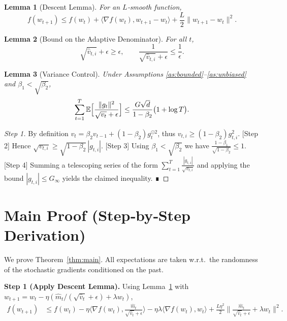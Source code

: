 \documentclass{article}
\newtheorem{lemma}{Lemma}
\newcommand{\E}{\mathbb{E}}
\begin{document}
\begin{lemma}[Descent Lemma]\label{lem:descent}
For an $L$‑smooth function,
\[
f(w_{t+1}) \le f(w_t) + \langle\nabla f(w_t), w_{t+1}-w_t\rangle + \frac{L}{2}\|w_{t+1}-w_t\|^{2}.
\]
\end{lemma}

\begin{lemma}[Bound on the Adaptive Denominator]\label{lem:denom}
For all $t$,
\[
\sqrt{\hat v_{t,i}}+\epsilon \ge \epsilon,\qquad
\frac{1}{\sqrt{\hat v_{t,i}}+\epsilon}\le \frac{1}{\epsilon}.
\]
\end{lemma}

\begin{lemma}[Variance Control]\label{lem:variance}
Under Assumptions \ref{as:bounded}–\ref{as:unbiased} and $\beta_1<\sqrt{\beta_2}$,
\[
\sum_{t=1}^{T}\E\Bigl[\frac{\|g_t\|^{2}}{\sqrt{v_{t}}+\epsilon}\Bigr]
\le
\frac{G\sqrt{d}}{1-\beta_2}\bigl(1+\log T\bigr).
\]
\end{lemma}
\begin{proof}
[Step 1] By definition $v_{t}= \beta_2 v_{t-1}+(1-\beta_2)g_t^{\odot2}$, thus $v_{t,i}\ge (1-\beta_2)g_{t,i}^{2}$.  
[Step 2] Hence $\sqrt{v_{t,i}}\ge \sqrt{1-\beta_2}\,|g_{t,i}|$.  
[Step 3] Using $\beta_1<\sqrt{\beta_2}$ we have $\frac{1-\beta_1}{\sqrt{1-\beta_2}}\le 1$.  
[Step 4] Summing a telescoping series of the form $\sum_{t=1}^{T}\frac{|g_{t,i}|}{\sqrt{v_{t,i}}}$ and applying the bound $|g_{t,i}|\le G_{\infty}$ yields the claimed inequality. ∎
\end{proof}

\section*{Main Proof (Step‑by‑Step Derivation)}
We prove Theorem~\ref{thm:main}.  
All expectations are taken w.r.t.\ the randomness of the stochastic gradients conditioned on the past.

\noindent\textbf{Step 1 (Apply Descent Lemma).}  
Using Lemma~\ref{lem:descent} with $w_{t+1}=w_t-\eta(\hat m_t/(\sqrt{\hat v_t}+\epsilon)+\lambda w_t)$,
\begin{align}
f(w_{t+1}) 
&\le f(w_t) -\eta\Big\langle \nabla f(w_t),\frac{\hat m_t}{\sqrt{\hat v_t}+\epsilon}\Big\rangle 
          -\eta\lambda\langle \nabla f(w_t), w_t\rangle
          +\frac{L\eta^{2}}{2}\Big\|\frac{\hat m_t}{\sqrt{\hat v_t}+\epsilon}+\lambda w_t\Big\|^{2}. \tag{1}
\end{align}
\end{document}
